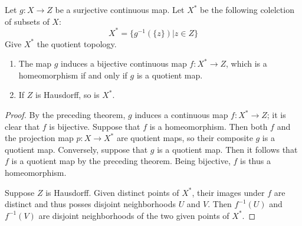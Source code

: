 \begin{corollary}
    Let $g:X\rightarrow Z$ be a surjective continuous map. Let $X^*$ be the following colelction of subsets of $X$: \begin{equation*}
        X^* = \{g^{-1}(\{z\})\vert z \in Z\}
    \end{equation*}
    Give $X^*$ the quotient topology. \begin{enumerate}
        \item The map $g$ induces a bijective continuous map $f:X^*\rightarrow Z$, which is a homeomorphism if and only if $g$ is a quotient map.
            \begin{center}
            \end{center}
            \item If $Z$ is Hausdorff, so is $X^*$.
    \end{enumerate}
\end{corollary}
\begin{proof}
    By the preceding theorem, $g$ induces a continuous map $f:X^*\rightarrow Z$; it is clear that $f$ is bijective. Suppose that $f$ is a homeomorphism. Then both $f$ and the projection map $p:X\rightarrow X^*$ are quotient maps, so their composite $g$ is a quotient map. Conversely, suppose that $g$ is a quotient map. Then it follows that $f$ is a quotient map by the preceding theorem. Being bijective, $f$ is thus a homeomorphism.

    Suppose $Z$ is Hausdorff. Given distinct points of $X^*$, their images under $f$ are distinct and thus posses disjoint neighborhoods $U$ and $V$. Then $f^{-1}(U)$ and $f^{-1}(V)$ are disjoint neighborhoods of the two given points of $X^*$.
\end{proof}

